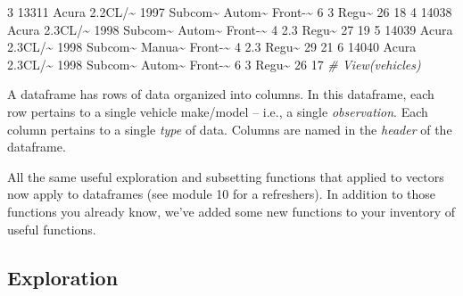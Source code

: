 \documentclass[
]{book}
\newenvironment{Shaded}{\begin{snugshade}}{\end{snugshade}}
\newcommand{\CommentTok}[1]{\textcolor[rgb]{0.56,0.35,0.01}{\textit{#1}}}
\newcommand{\DecValTok}[1]{\textcolor[rgb]{0.00,0.00,0.81}{#1}}
\newcommand{\ErrorTok}[1]{\textcolor[rgb]{0.64,0.00,0.00}{\textbf{#1}}}
\newcommand{\FloatTok}[1]{\textcolor[rgb]{0.00,0.00,0.81}{#1}}
\newcommand{\NormalTok}[1]{#1}
\newcommand{\SpecialCharTok}[1]{\textcolor[rgb]{0.00,0.00,0.00}{#1}}
\begin{document}
\begin{Shaded}
\begin{Highlighting}[]
\DecValTok{3} \DecValTok{13311}\NormalTok{ Acura }\FloatTok{2.2}\NormalTok{CL}\SpecialCharTok{/}\ErrorTok{\textasciitilde{}}  \DecValTok{1997}\NormalTok{ Subcom}\SpecialCharTok{\textasciitilde{}}\NormalTok{ Autom}\SpecialCharTok{\textasciitilde{}}\NormalTok{ Front}\SpecialCharTok{{-}}\ErrorTok{\textasciitilde{}}     \DecValTok{6}   \DecValTok{3}\NormalTok{   Regu}\SpecialCharTok{\textasciitilde{}}    \DecValTok{26}    \DecValTok{18}
\DecValTok{4} \DecValTok{14038}\NormalTok{ Acura }\FloatTok{2.3}\NormalTok{CL}\SpecialCharTok{/}\ErrorTok{\textasciitilde{}}  \DecValTok{1998}\NormalTok{ Subcom}\SpecialCharTok{\textasciitilde{}}\NormalTok{ Autom}\SpecialCharTok{\textasciitilde{}}\NormalTok{ Front}\SpecialCharTok{{-}}\ErrorTok{\textasciitilde{}}     \DecValTok{4}   \FloatTok{2.3}\NormalTok{ Regu}\SpecialCharTok{\textasciitilde{}}    \DecValTok{27}    \DecValTok{19}
\DecValTok{5} \DecValTok{14039}\NormalTok{ Acura }\FloatTok{2.3}\NormalTok{CL}\SpecialCharTok{/}\ErrorTok{\textasciitilde{}}  \DecValTok{1998}\NormalTok{ Subcom}\SpecialCharTok{\textasciitilde{}}\NormalTok{ Manua}\SpecialCharTok{\textasciitilde{}}\NormalTok{ Front}\SpecialCharTok{{-}}\ErrorTok{\textasciitilde{}}     \DecValTok{4}   \FloatTok{2.3}\NormalTok{ Regu}\SpecialCharTok{\textasciitilde{}}    \DecValTok{29}    \DecValTok{21}
\DecValTok{6} \DecValTok{14040}\NormalTok{ Acura }\FloatTok{2.3}\NormalTok{CL}\SpecialCharTok{/}\ErrorTok{\textasciitilde{}}  \DecValTok{1998}\NormalTok{ Subcom}\SpecialCharTok{\textasciitilde{}}\NormalTok{ Autom}\SpecialCharTok{\textasciitilde{}}\NormalTok{ Front}\SpecialCharTok{{-}}\ErrorTok{\textasciitilde{}}     \DecValTok{6}   \DecValTok{3}\NormalTok{   Regu}\SpecialCharTok{\textasciitilde{}}    \DecValTok{26}    \DecValTok{17}
\CommentTok{\# View(vehicles)}
\end{Highlighting}
\end{Shaded}

A dataframe has rows of data organized into columns. In this dataframe, each row pertains to a single vehicle make/model -- i.e., a single \emph{observation}. Each column pertains to a single \emph{type} of data. Columns are named in the \emph{header} of the dataframe.

All the same useful exploration and subsetting functions that applied to vectors now apply to dataframes (see module 10 for a refreshers). In addition to those functions you already know, we've added some new functions to your inventory of useful functions.

\hypertarget{exploration}{%
\subsection*{Exploration}\label{exploration}}
\end{document}

